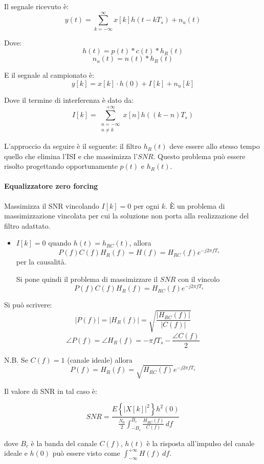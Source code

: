 Il segnale ricevuto è:
\[
y(t) = \sum_{k=-\infty}^{\infty} x[k] h(t - kT_s) + n_u(t)
\]

Dove:
\[
h(t) = p(t) * c(t) * h_R(t)
\]
\[
n_u(t) = n(t) * h_R(t)
\]

E il segnale al campionato è:
\[
y[k] = x[k] \cdot h(0) + I[k] + n_u[k]
\]

Dove il termine di interferenza è dato da:
\[
I[k] = \sum_{\substack{n=-\infty \\ n \neq k}}^{+\infty} x[n] h\left( (k-n)T_s \right)
\]

L'approccio da seguire è il seguente:
il filtro $h_R(t)$ deve essere allo stesso tempo quello che elimina l'ISI e che massimizza l'$SNR$. Questo problema può essere risolto progettando opportunamente $p(t)$ e $h_R(t)$.

\paragraph{Equalizzatore zero forcing}

Massimizza il SNR vincolando \( I[k] = 0 \) per ogni \( k \).  È un problema di massimizzazione vincolata per cui la soluzione non porta alla realizzazione del filtro adattato.

\begin{itemize}
    \item \( I[k] = 0 \) quando \( h(t) = h_{RC}(t) \), allora
    \[
    P(f) C(f) H_R(f) = H(f) = H_{RC}(f) e^{-j 2 \pi f T_s}
    \]
    per la causalità.
    
    Si pone quindi il problema di massimizzare il $SNR$ con il vincolo
    \[
    P(f) C(f) H_R(f) = H_{RC}(f) e^{-j 2 \pi f T_s}
    \]
\end{itemize}

Si può scrivere:
\[
\left| P(f) \right| = \left| H_R(f) \right| = \sqrt{\frac{\left| H_{RC}(f) \right|}{\left| C(f) \right|}}
\]
\[
\angle P(f) = \angle H_R(f) = - \pi f T_s - \frac{\angle C(f)}{2}
\]

N.B. Se \( C(f) = 1 \) (canale ideale) allora
\[
P(f) = H_R(f) = \sqrt{H_{RC}(f)} e^{-j 2 \pi f T_s}
\]

Il valore di SNR in tal caso è:



\[
SNR = \frac{E\left\{\left|X[k]\right|^2\right\} h^2(0)}{\frac{N_0}{2} 
\int_{-B_c}^{B_c} \frac{H_{RC}(f)}{C(f)}\, df }
\]

dove \( B_c \) è la banda del canale \( C(f) \), \( h(t) \) è la risposta all'impulso del canale ideale e $h(0)$ può essere visto come $
\int_{-\infty}^{+\infty} H(f)\, df$.

